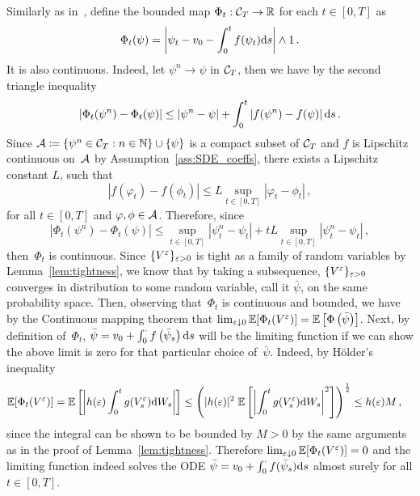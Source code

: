 Similarly as in~\cite{Chiarini2014OnProcesses}, define the bounded map $\Phi_t:\mathcal{C}_T\rightarrow \mathbb{R}$ for each $t\in[0,T]$ as 
$$
\Phi_t(\psi) = \left \vert \psi_t - v_0 - \int_0^t f(\psi_t)\mathrm{d} s \right \vert \land 1\,.
$$
It is also continuous. 
Indeed, let $\psi^n \rightarrow \psi$ in $\mathcal{C}_T$, then we have by the second triangle inequality 
$$
\left \vert \Phi_t(\psi^n) - \Phi_t(\psi) \right \vert \leq  \left \vert \psi^n - \psi \right \vert + \int_0^t \left \vert f(\psi^n) - f(\psi) \right \vert\mathrm{d} s\,.
$$
Since $\mathcal{A}\coloneqq \{\psi^n\in\mathcal{C}_T: n\in\mathbb{N}\}\cup \{\psi\}$ is a compact subset of $\mathcal{C}_T$ and $f$ is Lipschitz continuous on~$\mathcal{A}$ by Assumption~\ref{ass:SDE_coeffs}, there exists a Lipschitz constant $L$, such that
\[
\left\vert f(\varphi_t) - f(\phi_t) \right\vert \leq L \sup_{t\in[0,T]} |\varphi_t - \phi_t|\,,
\]
for all $t\in[0,T]$ and $\varphi, \phi\in\mathcal{A}$. Therefore, since
\[
\left \vert \Phi_t(\psi^n) - \Phi_t(\psi) \right \vert \leq \sup_{t\in[0,T]} \left \vert\psi_t^n - \psi_t\right \vert + t L \sup_{t\in[0,T]} \left \vert\psi_t^n - \psi_t\right \vert\,,
\]
then~$\Phi_t$ is continuous. Since $\{V^\varepsilon\}_{\varepsilon>0}$ is tight as a family of random variables by Lemma~\ref{lem:tightness}, we know that by taking a subsequence, $\{V^\varepsilon\}_{\varepsilon>0}$ converges in distribution to some random variable, call it $\bar\psi$, on the same probability space. 
Then, observing that~$\Phi_t$ is continuous and bounded, we have by the Continuous mapping theorem that $\lim_{\varepsilon\downarrow 0} \mathbb{E}[\Phi_t(V^\varepsilon)]=\mathbb{E}\left[\Phi\left(\bar\psi\right)\right]$. Next, by definition of~$\Phi_t$, $\bar{\psi}=v_0 + \int_0^\cdot f\left(\bar{\psi}_s\right)\mathrm{d} s$ will be the limiting function if we can show the above limit is zero for that particular choice of~$\bar\psi$. Indeed, by H{\"o}lder's inequality %
\begin{align*}
\EE[\Phi_t(V^\eps)]
 = \EE\left[\left\vert h(\eps) \int_0^t g(V_s^\eps) \D W_s \right\vert\right]
  & \leq \left( |h(\eps)|^2 \; \EE\left[\left\vert \int_0^t g(V_s^\eps) \D W_s \right\vert^2\right] \right)^{\frac{1}{2}} %
  \leq h(\eps) M\,,
\end{align*}
since the integral can be shown to be bounded by $M>0$ by the same arguments as in the proof of Lemma~\ref{lem:tightness}. Therefore $\lim_{\varepsilon\downarrow 0} \mathbb{E}[\Phi_t(V^\varepsilon)] = 0$ and the limiting function indeed solves the ODE $\bar{\psi}=v_0 + \int_0^\cdot f(\bar{\psi}_s)\mathrm{d} s$ almost surely for all $t\in[0,T]$.

